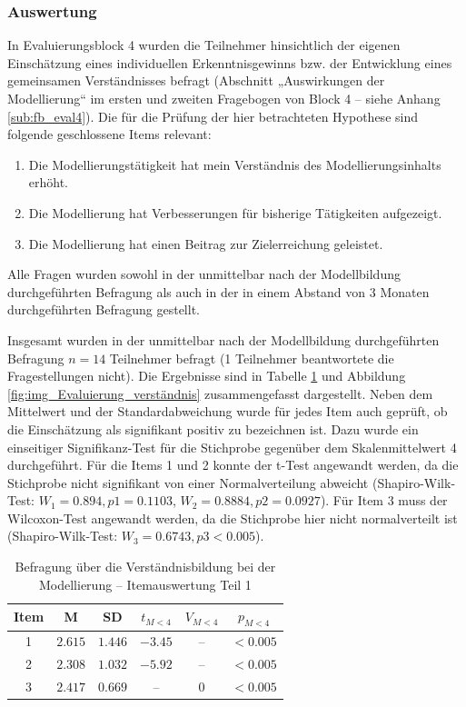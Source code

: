 \subsubsection{Auswertung} 

In Evaluierungsblock 4 wurden die Teilnehmer hinsichtlich der eigenen Einschätzung eines individuellen Erkenntnisgewinns bzw. der Entwicklung eines gemeinsamen Verständnisses befragt (Abschnitt „Auswirkungen der Modellierung“ im ersten und zweiten Fragebogen von Block 4  -- siehe Anhang \ref{sub:fb_eval4}). Die für die Prüfung der hier betrachteten Hypothese sind folgende geschlossene Items relevant:

\begin{enumerate}
	\item Die Modellierungstätigkeit hat mein Verständnis des Modellierungsinhalts erhöht.
	\item Die Modellierung hat Verbesserungen für bisherige Tätigkeiten aufgezeigt.
	\item Die Modellierung hat einen Beitrag zur Zielerreichung geleistet.
\end{enumerate}

Alle Fragen wurden sowohl in der unmittelbar nach der Modellbildung durchgeführten Befragung als auch in der in einem Abstand von 3 Monaten durchgeführten Befragung gestellt.

Insgesamt wurden in der unmittelbar nach der Modellbildung durchgeführten Befragung $n=14$ Teilnehmer befragt (1 Teilnehmer beantwortete die Fragestellungen nicht). Die Ergebnisse sind in Tabelle \ref{tab:verständnis} und Abbildung \ref{fig:img_Evaluierung_verständnis} zusammengefasst dargestellt. Neben dem Mittelwert und der Standardabweichung wurde für jedes Item auch geprüft, ob die Einschätzung als signifikant positiv zu bezeichnen ist. Dazu wurde ein einseitiger Signifikanz-Test für die Stichprobe gegenüber dem Skalenmittelwert 4 durchgeführt. Für die Items 1 und 2 konnte der t-Test angewandt werden, da die Stichprobe nicht signifikant von einer Normalverteilung abweicht (Shapiro-Wilk-Test: $W_{1}=0.894, p{1}=0.1103$, $W_{2}=0.8884, p{2}=0.0927$). Für Item 3 muss der Wilcoxon-Test angewandt werden, da die Stichprobe hier nicht normalverteilt ist (Shapiro-Wilk-Test: $W_{3}=0.6743, p{3}<0.005$).

\begin{table}[htbp]
	\centering
	\caption{Befragung über die Verständnisbildung bei der Modellierung -- Itemauswertung Teil 1}

\begin{tabular}{| c || c | c || c | c | c |}
  \hline
   Item & M & SD & $t_{M<4}$ & $V_{M<4}$ & $p_{M<4}$ \\ \hline
   1  & $2.615$ & $1.446$ & $-3.45$ & -- & $<0.005$ \\ 
   2  & $2.308$ & $1.032$ & $-5.92$ & -- & $<0.005$ \\ 
   3  & $2.417$ & $0.669$ & -- & $0$ & $<0.005$ \\ \hline
\end{tabular} \\ 
	\label{tab:verständnis}
\end{table}

